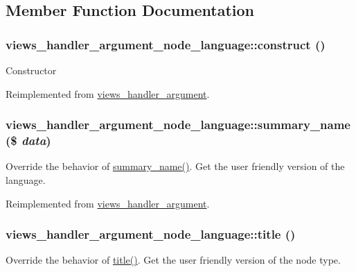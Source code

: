 \subsection{Member Function Documentation}
\hypertarget{classviews__handler__argument__node__language_a96f52469109294ad151b3ca21c261795}{
\subsubsection[{construct}]{\setlength{\rightskip}{0pt plus 5cm}views\_\-handler\_\-argument\_\-node\_\-language::construct ()}}
\label{classviews__handler__argument__node__language_a96f52469109294ad151b3ca21c261795}
Constructor 

Reimplemented from \hyperlink{classviews__handler__argument_a93594a31e95e1a14cead4f038d7b321b}{views\_\-handler\_\-argument}.\hypertarget{classviews__handler__argument__node__language_aa07770dbbc40710c5369f76f4d4b6a35}{
\subsubsection[{summary\_\-name}]{\setlength{\rightskip}{0pt plus 5cm}views\_\-handler\_\-argument\_\-node\_\-language::summary\_\-name (\$ {\em data})}}
\label{classviews__handler__argument__node__language_aa07770dbbc40710c5369f76f4d4b6a35}
Override the behavior of \hyperlink{classviews__handler__argument__node__language_aa07770dbbc40710c5369f76f4d4b6a35}{summary\_\-name()}. Get the user friendly version of the language. 

Reimplemented from \hyperlink{classviews__handler__argument_a4c55a340453eed4d35c69f7ac790cac1}{views\_\-handler\_\-argument}.\hypertarget{classviews__handler__argument__node__language_ab880be769744ec720d0b8e2e32671daa}{
\subsubsection[{title}]{\setlength{\rightskip}{0pt plus 5cm}views\_\-handler\_\-argument\_\-node\_\-language::title ()}}
\label{classviews__handler__argument__node__language_ab880be769744ec720d0b8e2e32671daa}
Override the behavior of \hyperlink{classviews__handler__argument__node__language_ab880be769744ec720d0b8e2e32671daa}{title()}. Get the user friendly version of the node type. 

